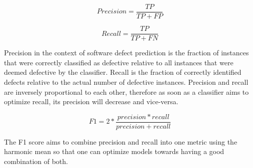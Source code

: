 \documentclass[../main.tex]{subfiles}
\begin{document}
\begin{equation}
    Precision = \frac{TP}{TP+FP}
\end{equation}

\begin{equation}
    Recall = \frac{TP}{TP+FN}
\end{equation}

\vspace{20pt}

Precision in the context of software defect prediction is the fraction of instances that were correctly classified as defective relative to all instances that were deemed defective by the classifier. Recall is the fraction of correctly identified defects relative to the actual number of defective instances. Precision and recall are inversely proportional to each other, therefore as soon as a classifier aims to optimize recall, its precision will decrease and vice-versa. 

\begin{equation}
    F1 = 2*\frac{precision*recall}{precision+recall}
\end{equation}

The F1 score aims to combine precision and recall into one metric using the harmonic mean so that one can optimize models towards having a good combination of both.
\end{document}
